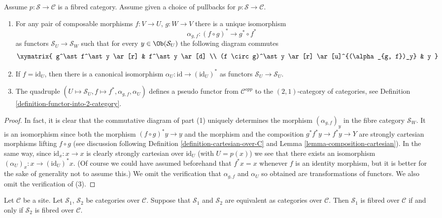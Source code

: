 \begin{lemma}
\label{lemma-fibred}
Assume $p : \mathcal{S} \to \mathcal{C}$ is a fibred category.
Assume given a choice of pullbacks for $p : \mathcal{S} \to \mathcal{C}$.
\begin{enumerate}
\item For any pair of composable morphisms $f : V \to U$,
$g : W \to V$ there is a unique isomorphism
$$
\alpha_{g, f} :
(f \circ g)^\ast
\longrightarrow
g^\ast \circ f^\ast
$$
as functors $\mathcal{S}_U \to \mathcal{S}_W$
such that for every $y\in \Ob(\mathcal{S}_U)$ the following
diagram commutes
$$
\xymatrix{
g^\ast f^\ast y \ar[r]
&
f^\ast y \ar[d] \\
(f \circ g)^\ast y \ar[r]
\ar[u]^{(\alpha_{g, f})_y}
&
y
}
$$
\item If $f = \text{id}_U$, then there is a canonical isomorphism
$\alpha_U : \text{id} \to (\text{id}_U)^*$ as functors
$\mathcal{S}_U \to \mathcal{S}_U$.
\item The quadruple
$(U \mapsto \mathcal{S}_U, f \mapsto f^*, \alpha_{g, f}, \alpha_U)$
defines a pseudo functor from $\mathcal{C}^{opp}$ to
the $(2, 1)$-category of categories, see
Definition \ref{definition-functor-into-2-category}.
\end{enumerate}
\end{lemma}

\begin{proof}
In fact, it is clear that the commutative diagram of
part (1) uniquely determines the morphism
$(\alpha_{g, f})_y$ in the fibre category
$\mathcal{S}_W$. It is an isomorphism since both
the morphism $(f \circ g)^*y \to y$ and the morphism
and the composition $g^*f^*y \to f^*y \to Y$ are strongly
cartesian morphisms lifting $f \circ g$ (see discussion
following Definition \ref{definition-cartesian-over-C} and
Lemma \ref{lemma-composition-cartesian}). In the same way,
since $\text{id}_x : x \to x$ is clearly strongly cartesian
over $\text{id}_U$ (with $U = p(x)$) we see that there exists
an isomorphism $(\alpha_U)_x : x \to (\text{id}_U)^*x$.
(Of course we could have assumed beforehand that $f^*x = x$
whenever $f$ is an identity morphism, but it is better for
the sake of generality not to assume this.)
We omit the verification that $\alpha_{g, f}$ and
$\alpha_U$ so obtained are transformations of functors.
We also omit the verification of (3).
\end{proof}

\begin{lemma}
\label{lemma-fibred-equivalent}
Let $\mathcal{C}$ be a site.
Let $\mathcal{S}_1$, $\mathcal{S}_2$ be categories over $\mathcal{C}$.
Suppose that $\mathcal{S}_1$ and $\mathcal{S}_2$ are equivalent
as categories over $\mathcal{C}$.
Then $\mathcal{S}_1$ is fibred over $\mathcal{C}$ if and only if
$\mathcal{S}_2$ is fibred over $\mathcal{C}$.
\end{lemma}

